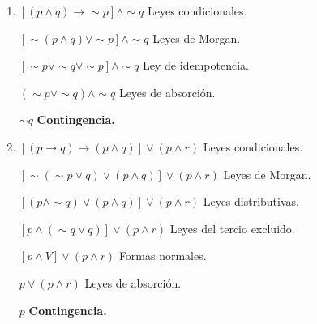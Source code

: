 \documentclass[12pt]{article}
\begin{document}
\begin{enumerate}[start=5]
            \item {\large $[(p \wedge q) \longrightarrow \sim p] \wedge \sim q$} {\footnotesize Leyes condicionales.}
                \par$[\sim (p \wedge q) \vee \sim p] \wedge \sim q$ {\footnotesize Leyes de Morgan.}
                \par$[\sim p \vee \sim q  \vee \sim p] \wedge \sim q$ {\footnotesize Ley de idempotencia.}
                \par$(\sim p \vee \sim q) \wedge \sim q$ {\footnotesize Leyes de absorción.}
                \par$\sim q$ \textbf{\footnotesize Contingencia.}
                \vspace{0.6cm}

            \item {\large $[(p \longrightarrow q) \longrightarrow (p \wedge q)] \vee (p \wedge r)$} {\footnotesize Leyes condicionales.}
                \par$[\sim (\sim p \vee q) \vee (p \wedge q)] \vee (p \wedge r)$ {\footnotesize Leyes de Morgan.}
                \par$[(p \wedge \sim q)\vee (p \wedge q)]  \vee (p \wedge r)$ {\footnotesize Leyes distributivas.}
                \par$[p \wedge (\sim q \vee q)]  \vee (p \wedge r)$ {\footnotesize Leyes del tercio excluido.}
                \par$[p \wedge V]  \vee (p \wedge r)$ {\footnotesize Formas normales.} 
                \par$p  \vee (p \wedge r)$ {\footnotesize Leyes de absorción.}
                \par$p$ \textbf{\footnotesize Contingencia.}
                \vspace{0.6cm}
            

\end{enumerate}
\end{document}
